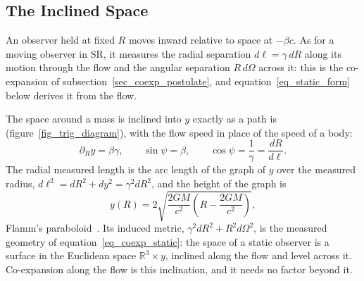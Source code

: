 \documentclass{iopjournal}
\begin{document}
\subsection{The Inclined Space}\label{sec_inclined_space}

An observer held at fixed $R$ moves inward relative to space at $-\beta c$. As for a moving observer in SR, it measures the radial separation $d\ell=\gamma\,dR$ along its motion through the flow and the angular separation $R\,d\Omega$ across it: this is the co-expansion of subsection~\ref{sec_coexp_postulate}, and equation~\eqref{eq_static_form} below derives it from the flow.

The space around a mass is inclined into $y$ exactly as a path is (figure~\ref{fig_trig_diagram}), with the flow speed in place of the speed of a body:
\begin{equation}\label{eq_flamm_slope}
    \partial_R y=\beta\gamma,
    \qquad
    \sin\psi=\beta,
    \qquad
    \cos\psi=\frac{1}{\gamma}=\frac{dR}{d\ell}.
\end{equation}
The radial measured length is the arc length of the graph of $y$ over the measured radius, $d\ell^2=dR^2+dy^2=\gamma^2dR^2$, and the height of the graph is
\begin{equation}\label{eq_flamm_height}
    y(R)=2\sqrt{\frac{2GM}{c^2}\left(R-\frac{2GM}{c^2}\right)} ,
\end{equation}
Flamm's paraboloid~\cite{Flamm1916}. Its induced metric, $\gamma^2dR^2+R^2d\Omega^2$, is the measured geometry of equation~\eqref{eq_coexp_static}: the space of a static observer is a surface in the Euclidean space $\mathbb{R}^3\times y$, inclined along the flow and level across it. Co-expansion along the flow is this inclination, and it needs no factor beyond it.
\end{document}
